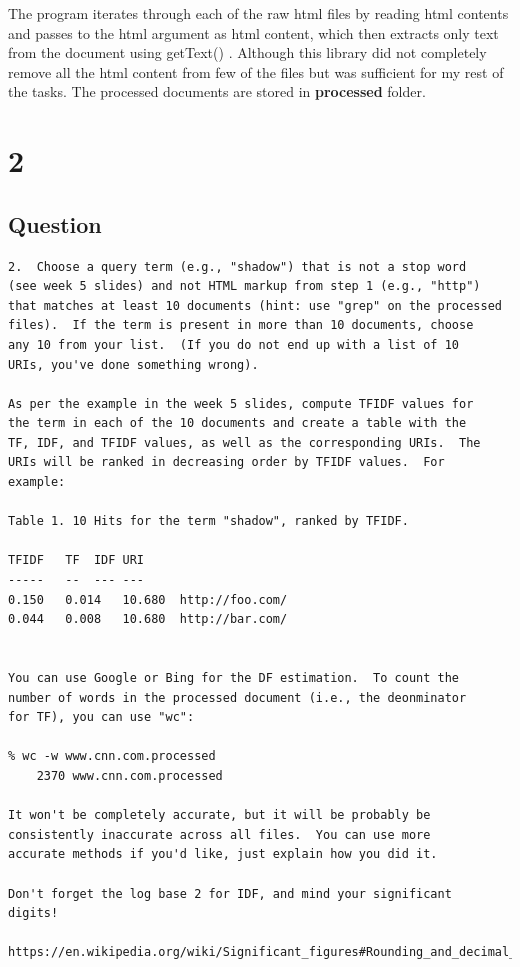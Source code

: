 \documentclass[letterpaper,11pt]{article}
\begin{document}
The program iterates through each of the raw html files by reading html contents and passes to the html argument as html content, which then extracts only text from the document using getText() \cite{gitref}. Although this library did not completely remove all the html content from few of the files but was sufficient for my rest of the tasks. The processed documents are stored in \textbf{processed} folder.





\clearpage


\section*{2}

\subsection*{Question}

\begin{verbatim}
2.  Choose a query term (e.g., "shadow") that is not a stop word
(see week 5 slides) and not HTML markup from step 1 (e.g., "http")
that matches at least 10 documents (hint: use "grep" on the processed
files).  If the term is present in more than 10 documents, choose
any 10 from your list.  (If you do not end up with a list of 10
URIs, you've done something wrong).

As per the example in the week 5 slides, compute TFIDF values for
the term in each of the 10 documents and create a table with the
TF, IDF, and TFIDF values, as well as the corresponding URIs.  The
URIs will be ranked in decreasing order by TFIDF values.  For
example:

Table 1. 10 Hits for the term "shadow", ranked by TFIDF.

TFIDF	TF	IDF	URI
-----	--	---	---
0.150	0.014	10.680	http://foo.com/
0.044	0.008	10.680	http://bar.com/


You can use Google or Bing for the DF estimation.  To count the
number of words in the processed document (i.e., the deonminator
for TF), you can use "wc":

% wc -w www.cnn.com.processed
    2370 www.cnn.com.processed

It won't be completely accurate, but it will be probably be
consistently inaccurate across all files.  You can use more 
accurate methods if you'd like, just explain how you did it.  

Don't forget the log base 2 for IDF, and mind your significant
digits!

https://en.wikipedia.org/wiki/Significant_figures#Rounding_and_decimal_places
\end{verbatim}
\end{document}
